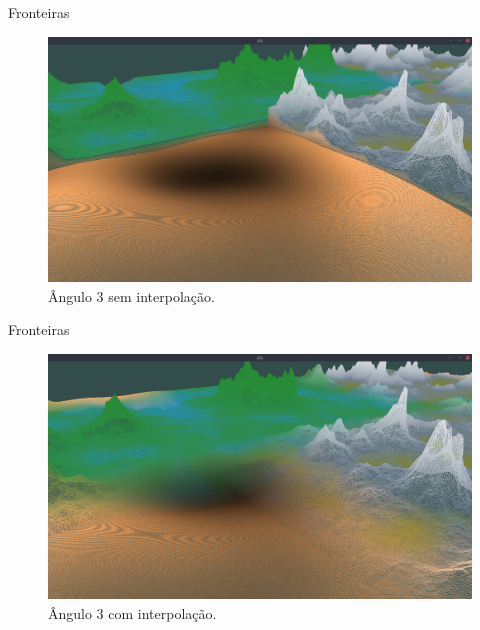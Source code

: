 \begin{frame}{Fronteiras}
    \begin{figure}[H]
        \centering
        \includegraphics[width=.9\textwidth]{img/border/a9/3s.png}
        \caption{Ângulo 3 sem interpolação.}
        \label{fig:img_border_a9_3s}
    \end{figure}
    
\end{frame}


\begin{frame}{Fronteiras}
    \begin{figure}[H]
        \centering
        \includegraphics[width=.9\textwidth]{img/border/a9/3c.png}
        \caption{Ângulo 3 com interpolação.}
        \label{fig:img_border_a9_3c}
    \end{figure}
    
\end{frame}

